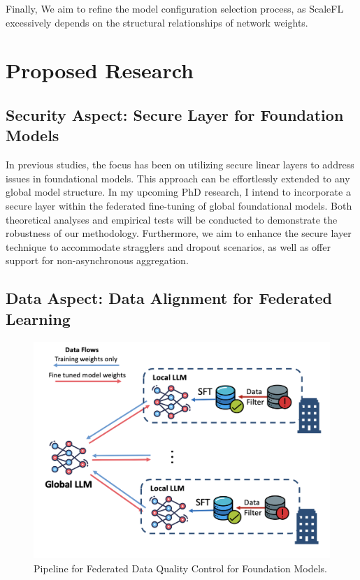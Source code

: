 \documentclass[withindex,glossary,firstyr]{cam-thesis}
\begin{document}
Finally, We aim to refine the model configuration selection process, as ScaleFL excessively depends on the structural relationships of network weights.


\chapter{Proposed Research} \label{Proposal}


\section{Security Aspect: Secure Layer for Foundation Models}


In previous studies, the focus has been on utilizing secure linear layers to address issues in foundational models. This approach can be effortlessly extended to any global model structure. In my upcoming PhD research, I intend to incorporate a secure layer within the federated fine-tuning of global foundational models. Both theoretical analyses and empirical tests will be conducted to demonstrate the robustness of our methodology. Furthermore, we aim to enhance the secure layer technique to accommodate stragglers and dropout scenarios, as well as offer support for non-asynchronous aggregation.

\section{Data Aspect: Data Alignment for Federated Learning}


\begin{figure}[t]
\centering
    \includegraphics[width=0.7\linewidth]{quality.png}
\caption{Pipeline for Federated Data Quality Control for Foundation Models.}
\label{fig:quality}
\vspace{-5mm}
\end{figure}
\end{document}

